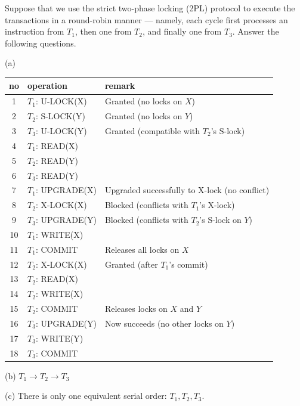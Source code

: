 \noindent Suppose that we use the strict two-phase locking (2PL) protocol to execute the transactions in a round-robin manner --- namely, each cycle first processes an instruction from $T_1$, then one from $T_2$, and finally one from $T_3$. Answer the following questions.

\begin{sol}
     (a)

    \begin{center}
    \begin{tabular}{c|l|l}
        no & operation & remark \\
        \hline
        1 & $T_1$: U-LOCK(X) & Granted (no locks on $X$) \\
        2 & $T_2$: S-LOCK(Y) & Granted (no locks on $Y$) \\
        3 & $T_3$: U-LOCK(Y) & Granted (compatible with $T_2$’s S-lock) \\
        4 & $T_1$: READ(X) & \\
        5 & $T_2$: READ(Y) & \\
        6 & $T_3$: READ(Y) & \\
        7 & $T_1$: UPGRADE(X) & Upgraded successfully to X-lock (no conflict) \\
        8 & $T_2$: X-LOCK(X) & Blocked (conflicts with $T_1$’s X-lock) \\
        9 & $T_3$: UPGRADE(Y) & Blocked (conflicts with $T_2$’s S-lock on $Y$) \\
        10 & $T_1$: WRITE(X) & \\
        11 & $T_1$: COMMIT & Releases all locks on $X$ \\
        12 & $T_2$: X-LOCK(X) & Granted (after $T_1$’s commit) \\
        13 & $T_2$: READ(X) & \\
        14 & $T_2$: WRITE(X) & \\
        15 & $T_2$: COMMIT & Releases locks on $X$ and $Y$ \\
        16 & $T_3$: UPGRADE(Y) & Now succeeds (no other locks on $Y$) \\
        17 & $T_3$: WRITE(Y) & \\
        18 & $T_3$: COMMIT &
    \end{tabular}
    \end{center}

    (b) $T_1 \rightarrow T_2 \rightarrow T_3$

    (c) There is only one equivalent serial order: $T_1, T_2, T_3$.
\end{sol}

